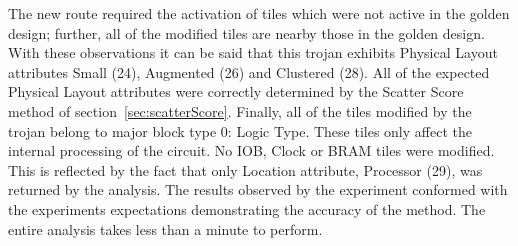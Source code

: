 The new route required the activation of tiles which were not active in the \gls{golden} design; further, all of the modified tiles are nearby those in the \gls{golden} design. 
With these observations it can be said that this trojan exhibits Physical Layout attributes Small (24), Augmented (26) and Clustered (28). 
All of the expected Physical Layout attributes were correctly determined by the Scatter Score method of section~\ref{sec:scatterScore}.
Finally, all of the tiles modified by the trojan belong to major block type 0: Logic Type.
These tiles only affect the internal processing of the circuit.
No \acrshort{IOB}, Clock or \acrshort{BRAM} tiles were modified.
This is reflected by the fact that only Location attribute, Processor (29), was returned by the analysis.
The results observed by the experiment conformed with the experiments expectations demonstrating the accuracy of the method.
The entire analysis takes less than a minute to perform.
